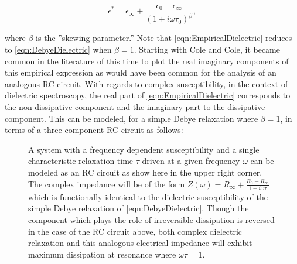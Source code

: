 \begin{equation}
\epsilon^*=\epsilon_\infty+\frac{\epsilon_0-\epsilon_\infty}{\left ( 1+i\omega\tau_{0} \right )^{\beta}},
\label{eqn:EmpiricalDielectric}
\end{equation}

\noindent where $\beta$ is the ''skewing parameter.'' Note that \eqn \ref{eqn:EmpiricalDielectric} reduces to \eqn \ref{eqn:DebyeDielectric} when $\beta=1$.  Starting with Cole and Cole, it became common in the literature of this time to plot the real \vs  imaginary components of this empirical expression as would have been common for the analysis of an analogous RC circuit\cite{Cole}. With regards to complex susceptibility, in the context of dielectric spectroscopy, the real part of \eqn \nolinebreak \ref{eqn:EmpiricalDielectric} corresponds to the non-dissipative component and the imaginary part to the dissipative component.  This can be modeled, for a simple Debye relaxation where $\beta=1$, in terms of a three component RC circuit as follows:

\begin{figure}[!htbp]
	\centering

	\caption{A system with a frequency dependent susceptibility and a single characteristic relaxation time $\tau$ driven at a given frequency $\omega$ can be modeled as an RC circuit as show here in the upper right corner. The complex impedance will be of the form $Z\left(\omega\right)=R_\infty+\frac{R_0-R_\infty}{1+i\omega\tau}$ which is functionally identical to the dielectric susceptibility of the simple Debye relaxation of \eqn\nolinebreak \ref{eqn:DebyeDielectric}.  Though the component which plays the role of irreversible dissipation is reversed in the case of the RC circuit above, both complex dielectric relaxation and this analogous electrical impedance will exhibit maximum dissipation at resonance where $\omega\tau=1$. }  
	\label{figure:ColeColePlot}
\end{figure}

